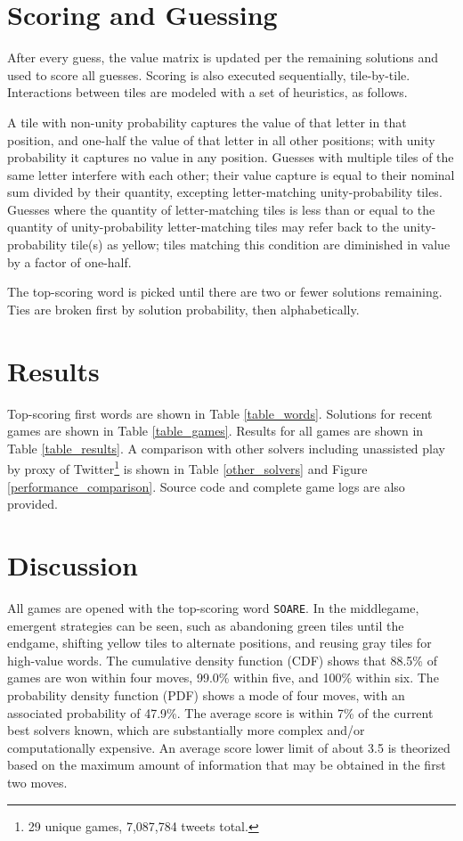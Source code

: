 \documentclass[twocolumn]{tudelft-aiaa}
\begin{document}
\section{Scoring and Guessing}

After every guess, the value matrix is updated per the remaining solutions and used to score all guesses. Scoring is also executed sequentially, tile-by-tile. Interactions between tiles are modeled with a set of heuristics, as follows.

A tile with non-unity probability captures the value of that letter in that position, and one-half the value of that letter in all other positions; with unity probability it captures no value in any position. Guesses with multiple tiles of the same letter interfere with each other; their value capture is equal to their nominal sum divided by their quantity, excepting letter-matching unity-probability tiles. Guesses where the quantity of letter-matching tiles is less than or equal to the quantity of unity-probability letter-matching tiles may refer back to the unity-probability tile(s) as yellow; tiles matching this condition are diminished in value by a factor of one-half.

The top-scoring word is picked until there are two or fewer solutions remaining. Ties are broken first by solution probability, then alphabetically.

\pagebreak

\section{Results}

Top-scoring first words are shown in Table \ref{table_words}. Solutions for recent games are shown in Table \ref{table_games}. Results for all games are shown in Table \ref{table_results}. A comparison with other solvers including unassisted play by proxy of Twitter\footnote{29 unique games, 7,087,784 tweets total.} is shown in Table \ref{other_solvers} and Figure \ref{performance_comparison}.\cite{WordleStats} Source code and complete game logs are also provided.\cite{Dichter}

\section{Discussion}

All games are opened with the top-scoring word \texttt{SOARE}. In the middlegame, emergent strategies can be seen, such as abandoning green tiles until the endgame, shifting yellow tiles to alternate positions, and reusing gray tiles for high-value words. The cumulative density function (CDF) shows that 88.5\% of games are won within four moves, 99.0\% within five, and 100\% within six. The probability density function (PDF) shows a mode of four moves, with an associated probability of 47.9\%. The average score is within 7\% of the current best solvers known, which are substantially more complex and/or computationally expensive. An average score lower limit of about 3.5 is theorized based on the maximum amount of information that may be obtained in the first two moves.\cite{Sanderson}
\end{document}
